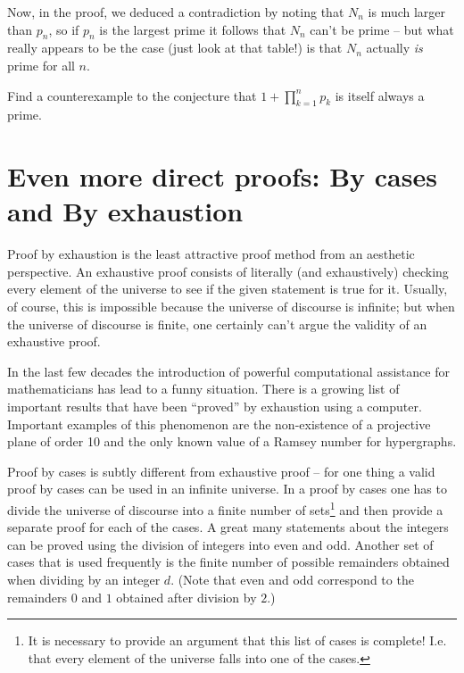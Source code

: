 Now, in the proof, we deduced a contradiction by noting that $N_n$ is
much larger than $p_n$, so if $p_n$ is the largest prime it follows that
$N_n$ can't be prime -- but what really appears to be the case (just look 
at that table!) is that $N_n$ actually \emph{is} prime for all $n$. 

\begin{exer}
Find a counterexample to the conjecture that $1+\prod_{k=1}^n p_k$
is itself always a prime.
\end{exer}


\clearpage





\newpage
\section[By cases and By exhaustion]{Even more direct proofs: By cases and By exhaustion}
\label{sec:cases}

Proof by exhaustion is the least attractive proof method from 
an aesthetic perspective.  An exhaustive proof consists of literally
(and exhaustively) checking every element of the universe to see
if the given statement is true for it.  Usually, of course, this is
impossible because the universe of discourse is infinite; but when the
universe of discourse is finite, one certainly can't argue the validity
of an exhaustive proof.  

In the last few decades the introduction of powerful computational
assistance for mathematicians has lead to a funny situation.  There
is a growing list of important results that have been ``proved'' by
exhaustion using a computer.  Important examples of this phenomenon
are the non-existence of a 
projective plane of order 10\cite{lam} and the 
only known value of a 
Ramsey number for hypergraphs\cite{radz}. 

Proof by cases is subtly different from exhaustive proof -- for one 
thing a valid proof by cases can be used in an infinite universe.  
In a proof by cases one has to divide the universe of discourse into
a finite number of sets\footnote{It is necessary to provide an argument that 
this list of cases is complete!  I.e. that every element of the universe
falls into one of the cases.} and then provide a separate proof for each
of the cases.  A great many statements about the integers can be proved
using the division of integers into even and odd.  Another set of 
cases that is used frequently is the finite number of possible remainders
obtained when dividing by an integer $d$.  (Note that even and odd correspond
to the remainders $0$ and $1$ obtained after division by $2$.)    
  

